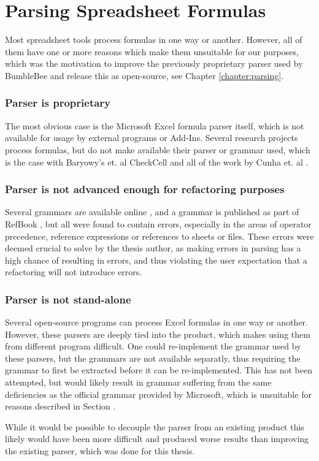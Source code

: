 \section{Parsing Spreadsheet Formulas}

Most spreadsheet tools process formulas in one way or another.
However, all of them have one or more reasons which make them unsuitable for our purposes, which was the motivation to improve the previously proprietary parser used by BumbleBee and release this as open-source, see Chapter \ref{chapter:parsing}.

\subsubsection{Parser is proprietary}

The most obvious case is the Microsoft Excel formula parser itself, which is not available for usage by external programs or Add-Ins.
Several research projects process formulas, but do not make available their parser or grammar used, which is the case with Baryowy's et. al CheckCell \cite{barowy2014checkcell} and all of the work by Cunha et. al \cite{cunha2010automatically, cunha2012towards, cunha2012mdsheet}.

\subsubsection{Parser is not advanced enough for refactoring purposes}

Several grammars are available online \cite{ewbi,fishbrain}, and a grammar is published as part of RefBook \cite{badame2012refactoring}, but all were found to contain errors, especially in the areas of operator precedence, reference expressions or references to sheets or files.
These errors were deemed crucial to solve by the thesis author, as making errors in parsing has a high chance of resulting in errors, and thus violating the user expectation that a refactoring will not introduce errors.

\subsubsection{Parser is not stand-alone}

Several open-source programs \cite{libreoffice,calligra,gnumeric} can process Excel formulas in one way or another.
However, these parsers are deeply tied into the product, which makes using them from different program difficult.
One could re-implement the grammar used by these parsers, but the grammars are not available separatly, thus requiring the grammar to first be extracted before it can be re-implemented. This has not been attempted, but would likely result in grammar suffering from the same deficiencies as the official grammar provided by Microsoft, which is unsuitable for reasons described in Section \label{sec:motivation}.

While it would be possible to decouple the parser from an existing product this likely would have been more difficult and produced worse results than improving the existing parser, which was done for this thesis.